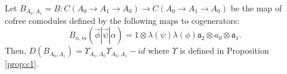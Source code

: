 %
\begin{prop}
\label{prop:c2}
Let 
$B_{A_0,A_1} = B:C(A_0 \to A_1 \to A_0)
\longrightarrow C(A_0 \to A_1 \to A_0)$ 
be the map of cofree comodules defined by 
the following maps to cogenerators:
\begin{equation}
\label{eq:def_sigma}
B_{n, m} (\vec{\phi} | \vec{\psi} | \alpha) 
= 1 \otimes \lambda(\psi)\lambda(\phi) \mathfrak{a}_2 \otimes a_0 \otimes \mathfrak{a}_1.
\end{equation}
Then, $D(B_{A_0,A_1}) = \Upsilon_{A_1,A_0}\Upsilon_{A_0,A_1} - id$ where
$\Upsilon$ is defined in Proposition 
\ref{prop:c1}.
\end{prop}
%
